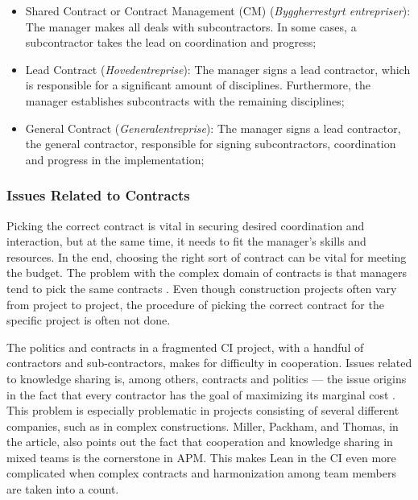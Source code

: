 \begin{itemize}
    \item Shared Contract or Contract Management (CM) (\textit{Byggherrestyrt entrepriser}): The manager makes all deals with subcontractors. In some cases, a subcontractor takes the lead on coordination and progress;
    \item Lead Contract (\textit{Hovedentreprise}): The manager signs a lead contractor, which is responsible for a significant amount of disciplines. Furthermore, the manager establishes subcontracts with the remaining disciplines; 
    \item General Contract (\textit{Generalentreprise}): The manager signs a lead contractor, the general contractor, responsible for signing subcontractors, coordination and progress in the implementation;
\end{itemize}

\subsubsection*{Issues Related to Contracts}
Picking the correct contract is vital in securing desired coordination and interaction, but at the same time, it needs to fit the manager's skills and resources. In the end, choosing the right sort of contract can be vital for meeting the budget. The problem with the complex domain of contracts is that managers tend to pick the same contracts \cite{laedre2006procurement}. Even though construction projects often vary from project to project, the procedure of picking the correct contract for the specific project is often not done.

The politics and contracts in a fragmented CI project, with a handful of contractors and sub-contractors, makes for difficulty in cooperation. Issues related to knowledge sharing is, among others, contracts and politics \cite{alashwal2011knowledge} — the issue origins in the fact that every contractor has the goal of maximizing its marginal cost \cite{miller2002harmonization}. This problem is especially problematic in projects consisting of several different companies, such as in complex constructions. Miller, Packham, and Thomas, in the article, also points out the fact that cooperation and knowledge sharing in mixed teams is the cornerstone in APM. This makes Lean in the CI even more complicated when complex contracts and harmonization among team members are taken into a count. 

